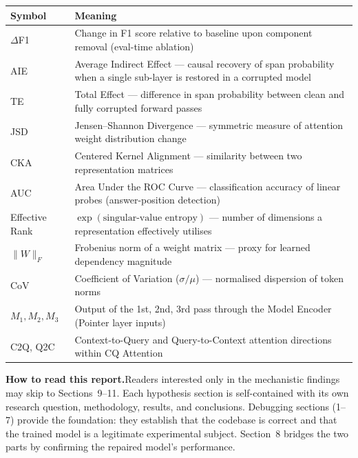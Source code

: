 \documentclass[10pt]{article}
\begin{document}
\begin{center}
\small
\begin{tabularx}{0.88\linewidth}{lX}
\toprule
\textbf{Symbol} & \textbf{Meaning} \\
\midrule
$\Delta$F1 & Change in F1 score relative to baseline upon component removal (eval-time ablation) \\
AIE & Average Indirect Effect --- causal recovery of span probability when a single sub-layer is restored in a corrupted model \\
TE & Total Effect --- difference in span probability between clean and fully corrupted forward passes \\
JSD & Jensen--Shannon Divergence --- symmetric measure of attention weight distribution change \\
CKA & Centered Kernel Alignment --- similarity between two representation matrices \\
AUC & Area Under the ROC Curve --- classification accuracy of linear probes (answer-position detection) \\
Effective Rank & $\exp(\text{singular-value entropy})$ --- number of dimensions a representation effectively utilises \\
$\|W\|_F$ & Frobenius norm of a weight matrix --- proxy for learned dependency magnitude \\
CoV & Coefficient of Variation ($\sigma / \mu$) --- normalised dispersion of token norms \\
$M_1, M_2, M_3$ & Output of the 1st, 2nd, 3rd pass through the Model Encoder (Pointer layer inputs) \\
C2Q, Q2C & Context-to-Query and Query-to-Context attention directions within CQ Attention \\
\bottomrule
\end{tabularx}
\end{center}

\vspace{0.6em}

\textbf{How to read this report.}\quad Readers interested only in the mechanistic findings may skip to Sections~9--11. Each hypothesis section is self-contained with its own research question, methodology, results, and conclusions. Debugging sections (1--7) provide the foundation: they establish that the codebase is correct and that the trained model is a legitimate experimental subject. Section~8 bridges the two parts by confirming the repaired model's performance.

\vspace{0.6em}
\end{document}
